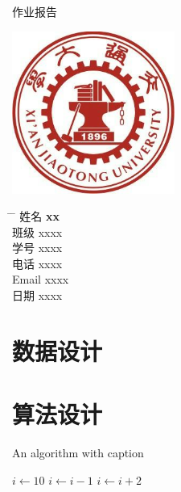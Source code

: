 \documentclass[UTF8]{ctexart}
\begin{document}
\begin{titlepage}
    \begin{center}
        \Huge{作业报告}
        \noindent{\color{BrickRed} \rule{\linewidth}{1mm}}
        \Huge
        \vspace{0.5cm}
		\LARGE
		\vspace{1.5cm}
		\textbf{}

        \includegraphics[width=0.4\textwidth]{school_emblem.png}

        \vspace{1.5cm}
    \end{center}
    \Large
    \begin{tabbing}
        \hspace*{1em}\= \hspace*{8em} \= \kill %
        \> 姓名 \>  \textbf{xx} \\
        \> 班级 \>  xxxx \\
        \> 学号 \>  xxxx  \\
        \> 电话  \> xxxx \\
        \> Email \> xxxx \\
        \> 日期 \>  xxxx
    \end{tabbing}
    
\end{titlepage}
\setlength{\headheight}{22pt}
\tableofcontents
\newpage{}
\section{数据设计}

\section{算法设计}
\listofalgorithms{}

\begin{algorithm}
\caption{An algorithm with caption}\label{alg:cap}
\begin{algorithmic}
    \State{}\(i \gets 10\)
        \State{}\(i \gets i-1\)
    \Else{}
            \State{}\(i \gets i+2\)
        \EndIf{}
    \EndIf{}
\end{algorithmic}
\end{algorithm}
\end{document}

